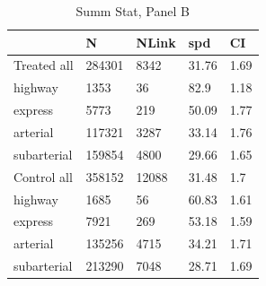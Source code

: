 \begin{table}[htbp]
\caption{\label{clabel} Summ Stat, Panel B}\centering\medskip
\begin{tabular}{|l|l|l|l|l|}\hline  
 & N  & NLink  & spd  & CI  \\ \hline  
Treated all & 284301 & 8342 & 31.76 & 1.69 \\ \hline 
highway & 1353 & 36 & 82.9 & 1.18 \\ \hline 
express & 5773 & 219 & 50.09 & 1.77 \\ \hline 
arterial & 117321 & 3287 & 33.14 & 1.76 \\ \hline 
subarterial & 159854 & 4800 & 29.66 & 1.65 \\ \hline 
Control all & 358152 & 12088 & 31.48 & 1.7 \\ \hline 
highway & 1685 & 56 & 60.83 & 1.61 \\ \hline 
express & 7921 & 269 & 53.18 & 1.59 \\ \hline 
arterial & 135256 & 4715 & 34.21 & 1.71 \\ \hline 
subarterial & 213290 & 7048 & 28.71 & 1.69 \\ \hline 
  \end{tabular}
\end{table}
